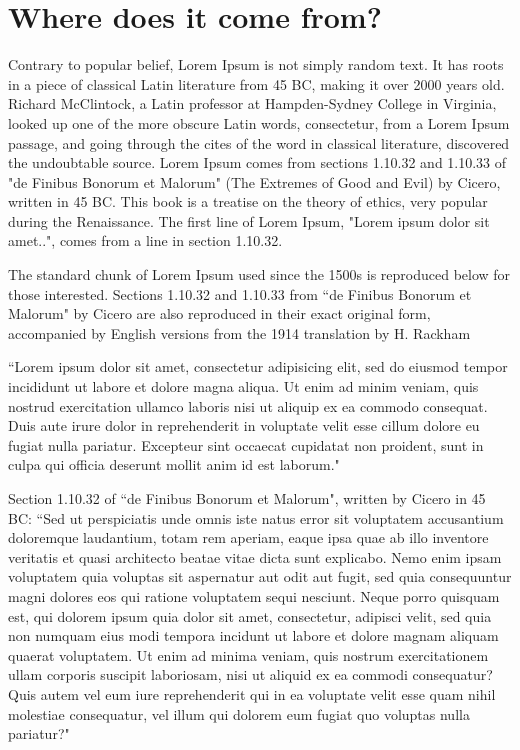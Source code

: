 \section{Where does it come from?}  %
\label{section1.3}

Contrary to popular belief, Lorem Ipsum is not simply random text. It has roots in a piece of classical Latin literature from 45 BC, making it over 2000 years old. Richard McClintock, a Latin professor at Hampden-Sydney College in Virginia, looked up one of the more obscure Latin words, consectetur, from a Lorem Ipsum passage, and going through the cites of the word in classical literature, discovered the undoubtable source. Lorem Ipsum comes from sections 1.10.32 and 1.10.33 of "de Finibus Bonorum et Malorum" (The Extremes of Good and Evil) by Cicero, written in 45 BC. This book is a treatise on the theory of ethics, very popular during the Renaissance. The first line of Lorem Ipsum, "Lorem ipsum dolor sit amet..", comes from a line in section 1.10.32.

The standard chunk of Lorem Ipsum used since the 1500s is reproduced below for those interested. Sections 1.10.32 and 1.10.33 from ``de Finibus Bonorum et Malorum" by Cicero are also reproduced in their exact original form, accompanied by English versions from the 1914 translation by H. Rackham

``Lorem ipsum dolor sit amet, consectetur adipisicing elit, sed do eiusmod tempor incididunt ut labore et dolore magna aliqua. Ut enim ad minim veniam, quis nostrud exercitation ullamco laboris nisi ut aliquip ex ea commodo consequat. Duis aute irure dolor in reprehenderit in voluptate velit esse cillum dolore eu fugiat nulla pariatur. Excepteur sint occaecat cupidatat non proident, sunt in culpa qui officia deserunt mollit anim id est laborum."

Section 1.10.32 of ``de Finibus Bonorum et Malorum", written by Cicero in 45 BC: ``Sed ut perspiciatis unde omnis iste natus error sit voluptatem accusantium doloremque laudantium, totam rem aperiam, eaque ipsa quae ab illo inventore veritatis et quasi architecto beatae vitae dicta sunt explicabo. Nemo enim ipsam voluptatem quia voluptas sit aspernatur aut odit aut fugit, sed quia consequuntur magni dolores eos qui ratione voluptatem sequi nesciunt. Neque porro quisquam est, qui dolorem ipsum quia dolor sit amet, consectetur, adipisci velit, sed quia non numquam eius modi tempora incidunt ut labore et dolore magnam aliquam quaerat voluptatem. Ut enim ad minima veniam, quis nostrum exercitationem ullam corporis suscipit laboriosam, nisi ut aliquid ex ea commodi consequatur? Quis autem vel eum iure reprehenderit qui in ea voluptate velit esse quam nihil molestiae consequatur, vel illum qui dolorem eum fugiat quo voluptas nulla pariatur?"

